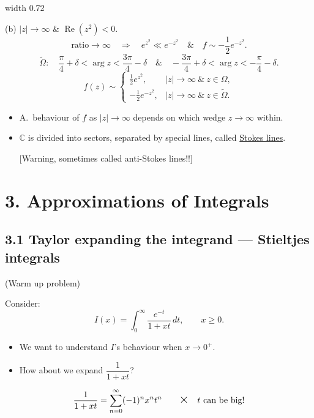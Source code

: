\documentclass[11pt,a4paper]{article}
\begin{document}
\begin{center}
    \pdfximage width 0.72\linewidth {figures/asymptotic-lecture3-stokes-lines.png}
    \pdfrefximage\pdflastximage
\end{center}

\noindent
(b) $|z|\to\infty$ \& $\operatorname{Re}(z^2)<0$.
\[
    \text{ratio}\to\infty
    \quad\Rightarrow\quad e^{z^2}\ll e^{-z^2}
    \quad\&\quad f\sim-\frac{1}{2}e^{-z^2}.
\]
\[
    \widetilde{\Omega}:\quad
    \frac{\pi}{4}+\delta<\arg z<\frac{3\pi}{4}-\delta
    \quad\&\quad
    -\frac{3\pi}{4}+\delta<\arg z<-\frac{\pi}{4}-\delta.
\]
\[
    f(z)\sim
    \begin{cases}
        \frac{1}{2}e^{z^2}, & |z|\to\infty\ \&\ z\in\Omega,\\
        -\frac{1}{2}e^{-z^2}, & |z|\to\infty\ \&\ z\in\widetilde{\Omega}.
    \end{cases}
\]

\begin{itemize}
    \item A.\ behaviour of $f$ as $|z|\to\infty$ depends on which wedge
    $z\to\infty$ within.
    \item $\mathbb{C}$ is divided into sectors, separated by special lines,
    called \underline{Stokes lines}.

    [Warning, sometimes called anti-Stokes lines!!]
\end{itemize}

\section*{3. Approximations of Integrals}

\subsection*{3.1 Taylor expanding the integrand --- Stieltjes integrals}

(Warm up problem)

Consider:
\[
    I(x)=\int_0^\infty\frac{e^{-t}}{1+xt}\,dt,
    \qquad x\geq0.
\]
\begin{itemize}
    \item We want to understand $I$'s behaviour when $x\to0^+$.
    \item How about we expand $\dfrac{1}{1+xt}$?
\end{itemize}
\[
    \frac{1}{1+xt}=\sum_{n=0}^\infty(-1)^n x^n t^n
    \qquad\text{\Large$\times$}\quad t\text{ can be big!}
\]
\end{document}
